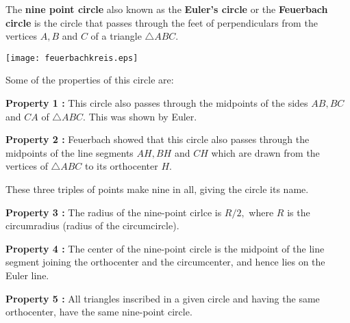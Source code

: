 \documentclass[12pt]{article}
\begin{document}
The \textbf{nine point circle} also known as the \textbf{Euler's circle} or the \textbf{Feuerbach circle} is the circle that passes through the feet of perpendiculars from the vertices $A, B$ and $C$ of a triangle $\triangle ABC.$
\begin{center}
\texttt{[image: feuerbachkreis.eps]}
\end{center}

Some of the properties of this circle are:

\textbf{Property 1 : }
This circle also passes through the midpoints of the sides $AB, BC$ and $CA$ of $\triangle ABC.$ This was shown by Euler.

\textbf{Property 2 : }
Feuerbach showed that this circle also passes through the midpoints of the line segments $AH, BH$ and $CH$ which are drawn from the vertices of $\triangle ABC$ to its orthocenter $H.$

These three triples of points make nine in all, giving the circle its name.

\textbf{Property 3 : }
The radius of the nine-point cirlce is $R/2,$ where $R$ is the circumradius (radius of the circumcircle).

\textbf{Property 4 : }
The center of the nine-point circle is the midpoint of the line segment joining the orthocenter and the circumcenter, and hence lies on the Euler line.

\textbf{Property 5 : }
All triangles inscribed in a given circle and having the same orthocenter, have the same nine-point circle.
\end{document}
